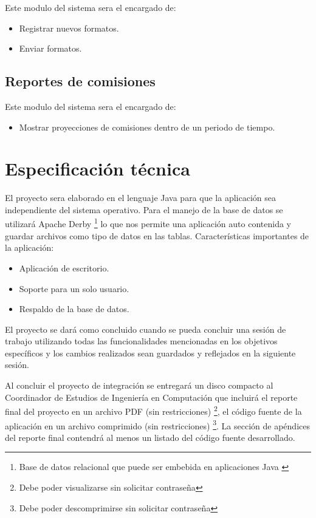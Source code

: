 Este modulo del sistema sera el encargado de:
\begin{itemize}
	\item Registrar nuevos formatos.
	\item Enviar formatos.
\end{itemize}

\subsection*{Reportes de comisiones}

Este modulo del sistema sera el encargado de:
\begin{itemize}
	\item Mostrar proyecciones de comisiones dentro de un periodo de tiempo.
\end{itemize}

\section{Especificación técnica}
El proyecto sera elaborado en el lenguaje Java para que la aplicación sea independiente del sistema operativo. Para el manejo de la base de datos se utilizará Apache Derby \footnote{Base de datos relacional que puede ser embebida en aplicaciones Java \cite{www:derby}} lo que nos permite una aplicación auto contenida y guardar archivos como tipo de datos en las tablas.
Características importantes de la aplicación:
\begin{itemize}
	\item Aplicación de escritorio.
	\item Soporte para un solo usuario.
	\item Respaldo de la base de datos.
\end{itemize}

El proyecto se dará como concluido cuando se pueda concluir una sesión de trabajo utilizando todas las funcionalidades mencionadas en los objetivos específicos y los cambios realizados sean guardados y reflejados en la siguiente sesión.

Al concluir el proyecto de integración se entregará un disco compacto al Coordinador
de Estudios de Ingeniería en Computación que incluirá el reporte final del proyecto
en un archivo PDF (sin restricciones) \footnote{Debe poder visualizarse sin solicitar contraseña}, el código fuente de la aplicación en un archivo comprimido (sin restricciones) \footnote{Debe poder descomprimirse sin solicitar contraseña}. La sección de apéndices del reporte final contendrá al
menos un listado del código fuente desarrollado.

